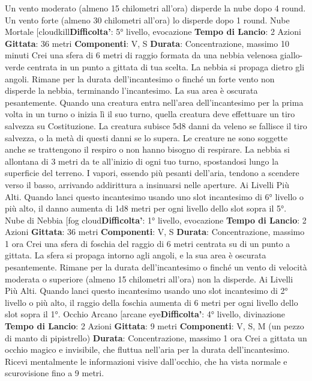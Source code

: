 \begin{multicols}{2}
Un vento moderato (almeno 15 chilometri all’ora)
disperde la nube dopo 4 round. Un vento forte (almeno
30 chilometri all’ora) lo disperde dopo 1 round.
Nube Mortale
[cloudkill\textbf{Difficolta'}:
5° livello, evocazione
\textbf{Tempo di Lancio}: 2 Azioni
\textbf{Gittata}: 36 metri
\textbf{Componenti}: V, S
\textbf{Durata}: Concentrazione, massimo 10 minuti
Crei una sfera di 6 metri di raggio formata da una
nebbia velenosa giallo-verde centrata in un punto a
gittata di tua scelta. La nebbia si propaga dietro gli
angoli. Rimane per la durata dell’incantesimo o finché
un forte vento non disperde la nebbia, terminando
l’incantesimo. La sua area è oscurata pesantemente.
Quando una creatura entra nell’area dell’incantesimo
per la prima volta in un turno o inizia lì il suo turno,
quella creatura deve effettuare un tiro salvezza su
Costituzione. La creatura subisce 5d8 danni da veleno
se fallisce il tiro salvezza, o la metà di questi danni se lo
supera. Le creature ne sono soggette anche se
trattengono il respiro o non hanno bisogno di respirare.
La nebbia si allontana di 3 metri da te all’inizio di ogni
tuo turno, spostandosi lungo la superficie del terreno. I
vapori, essendo più pesanti dell’aria, tendono a
scendere verso il basso, arrivando addirittura a
insinuarsi nelle aperture.
Ai Livelli Più Alti. Quando lanci questo incantesimo
usando uno slot incantesimo di 6° livello o più alto, il
danno aumenta di 1d8 metri per ogni livello dello slot
sopra il 5°.
Nube di Nebbia
[fog cloud\textbf{Difficolta'}:
1° livello, evocazione
\textbf{Tempo di Lancio}: 2 Azioni
\textbf{Gittata}: 36 metri
\textbf{Componenti}: V, S
\textbf{Durata}: Concentrazione, massimo 1 ora
Crei una sfera di foschia del raggio di 6 metri centrata
su di un punto a gittata. La sfera si propaga intorno agli
angoli, e la sua area è oscurata pesantemente. Rimane
per la durata dell’incantesimo o finché un vento di
velocità moderata o superiore (almeno 15 chilometri
all’ora) non la disperde.
Ai Livelli Più Alti. Quando lanci questo incantesimo
usando uno slot incantesimo di 2° livello o più alto, il
raggio della foschia aumenta di 6 metri per ogni livello
dello slot sopra il 1°.
Occhio Arcano
[arcane eye\textbf{Difficolta'}:
4° livello, divinazione
\textbf{Tempo di Lancio}: 2 Azioni
\textbf{Gittata}: 9 metri
\textbf{Componenti}: V, S, M (un pezzo di manto di pipistrello)
\textbf{Durata}: Concentrazione, massimo 1 ora
Crei a gittata un occhio magico e invisibile, che fluttua
nell’aria per la durata dell’incantesimo.
Ricevi mentalmente le informazioni visive dall’occhio,
che ha vista normale e scurovisione fino a 9 metri.

\end{multicols}
